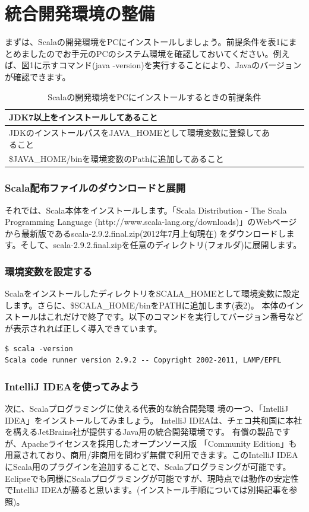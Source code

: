 \documentclass[10pt]{jarticle}
\begin{document}
\part{統合開発環境の整備}
まずは、Scalaの開発環境をPCにインストールしましょう。前提条件を表1にまとめましたのでお手元のPCのシステム環境を確認しておいてください。例えば、図1に示すコマンド(java -version)を実行することにより、Javaのバージョンが確認できます。 

\begin{table}[htb]
  \caption{Scalaの開発環境をPCにインストールするときの前提条件}
  \begin{center}
    \begin{tabular}{|l|c|r||r|} \hline
      JDK7以上をインストールしてあること\\ \hline
      JDKのインストールパスをJAVA\_HOMEとして環境変数に登録してあること\\ \hline
      \$JAVA\_HOME/binを環境変数のPathに追加してあること\\ \hline 
    \end{tabular}
  \end{center}
  \label{tb:table1}
\end{table}

\section{Scala配布ファイルのダウンロードと展開}
それでは、Scala本体をインストールします。「Scala Distribution - The Scala Programming Language (http://www.scala-lang.org/downloads)」のWebページから最新版であるscala-2.9.2.final.zip(2012年7月上旬現在) をダウンロードします。そして、scala-2.9.2.final.zipを任意のディレクトリ(フォルダ)に展開します。
\section{環境変数を設定する}
ScalaをインストールしたディレクトリをSCALA\_HOMEとして環境変数に設定します。さらに、\$SCALA\_HOME/binをPATHに追加します(表2)。 本体のインストールはこれだけで終了です。以下のコマンドを実行してバージョン番号などが表示されれば正しく導入できています。

\begin{verbatim}
$ scala -version
Scala code runner version 2.9.2 -- Copyright 2002-2011, LAMP/EPFL
\end{verbatim}

\section{IntelliJ IDEAを使ってみよう}
次に、Scalaプログラミングに使える代表的な統合開発環 境の一つ、「IntelliJ IDEA」をインストールしてみましょう。 IntelliJ IDEAは、チェコ共和国に本社を構えるJetBrains社が提供するJava用の統合開発環境です。 有償の製品ですが、Apacheライセンスを採用したオープンソース版 「Community Edition」も用意されており、商用/非商用を問わず無償で利用できます。このIntelliJ IDEAにScala用のプラグインを追加することで、Scalaプログラミングが可能です。Eclipseでも同様にScalaプログラミングが可能ですが、現時点では動作の安定性でIntelliJ IDEAが勝ると思います。(インストール手順については別掲記事を参照)。
\end{document}
